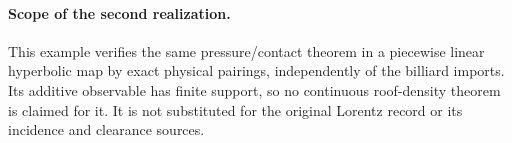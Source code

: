 \paragraph{Scope of the second realization.}
This example verifies the same pressure/contact theorem in a piecewise
linear hyperbolic map by exact physical pairings, independently of the
billiard imports. Its additive observable has finite support, so no
continuous roof-density theorem is claimed for it. It is not substituted
for the original Lorentz record or its incidence and clearance sources.
